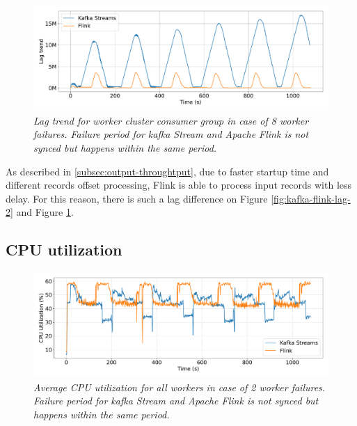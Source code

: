 \begin{figure}[H]
    \centering
    \includegraphics[width=1\textwidth]{figures/kafka-flink/lag-trend-8pod-kafka-flink}
    \caption{\textit{Lag trend for worker cluster consumer group in case of 8 worker failures.
    Failure period for kafka Stream and Apache Flink is not synced but happens within the same period.}}
    \label{fig:kafka-flink-lag-8}
\end{figure}

As described in \ref{subsec:output-throughtput}, due to faster startup time
and different records offset processing, Flink is able to process
input records with less delay.
For this reason, there is such a lag difference on Figure \ref{fig:kafka-flink-lag-2} and Figure \ref{fig:kafka-flink-lag-8}.

\newpage
\subsection{CPU utilization}\label{subsec:cpu-utilization}

\begin{figure}[H]
    \centering
    \includegraphics[width=1\textwidth]{figures/kafka-flink/cpu-utilization-2pods-kafka-flink}
    \caption{\textit{Average CPU utilization for all workers in case of 2 worker failures.
    Failure period for kafka Stream and Apache Flink is not synced but happens within the same period.}}
    \label{fig:kafka-flink-cpu-2}
\end{figure}


